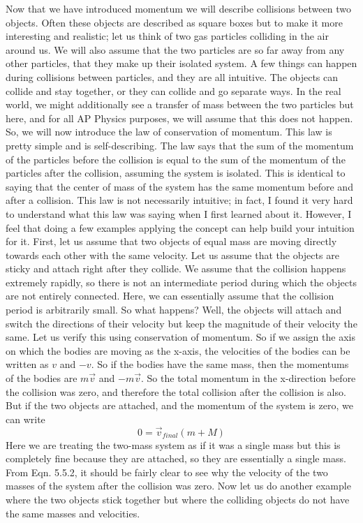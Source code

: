 \documentclass{article}[gray]
\numberwithin{equation}{subsection}
\begin{document}
Now that we have introduced momentum we will describe collisions between two objects. Often these objects are described as square boxes but to make it more interesting and realistic; let us think of two gas particles colliding in the air around us. We will also assume that the two particles are so far away from any other particles, that they make up their isolated system. A few things can happen during collisions between particles, and they are all intuitive. The objects can collide and stay together, or they can collide and go separate ways. In the real world, we might additionally see a transfer of mass between the two particles but here, and for all AP Physics purposes, we will assume that this does not happen. So, we will now introduce the law of conservation of momentum. This law is pretty simple and is self-describing. The law says that the sum of the momentum of the particles before the collision is equal to the sum of the momentum of the particles after the collision,  assuming the system is isolated. This is identical to saying that the center of mass of the system has the same momentum before and after a collision. This law is not necessarily intuitive; in fact, I found it very hard to understand what this law was saying when I first learned about it. However, I feel that doing a few examples applying the concept can help build your intuition for it. First, let us assume that two objects of equal mass are moving directly towards each other with the same velocity. Let us assume that the objects are sticky and attach right after they collide. We assume that the collision happens extremely rapidly, so there is not an intermediate period during which the objects are not entirely connected. Here, we can essentially assume that the collision period is arbitrarily small. So what happens? Well, the objects will attach and switch the directions of their velocity but keep the magnitude of their velocity the same. Let us verify this using conservation of momentum.  So if we assign the axis on which the bodies are moving as the x-axis, the velocities of the bodies can be written as $v$ and $-v$. So if the bodies have the same mass, then the momentums of the bodies are $m\vec{v}$ and $-m\vec{v}$. So the total momentum in the x-direction before the collision was zero, and therefore the total collision after the collision is also. But if the two objects are attached, and the momentum of the system is zero, we can write \begin{equation}0=\vec{v}_{final} \left(m+M\right)\end{equation} Here we are treating the two-mass system as if it was a single mass but this is completely fine because they are attached, so they are essentially a single mass. From Eqn. 5.5.2, it should be fairly clear to see why the velocity of the two masses of the system after the collision was zero. Now let us do another example where the two objects stick together but where the colliding objects do not have the same masses and velocities. 
\end{document}
